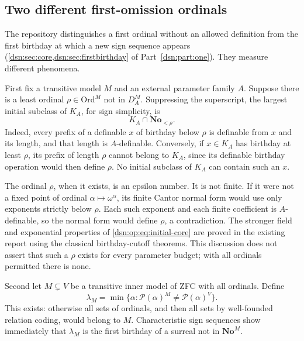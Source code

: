 \documentclass[11pt,a4paper]{article}
\numberwithin{equation}{section}
\theoremstyle{definition}
\theoremstyle{remark}
\newcommand{\No}{\mathbf{No}}
\newcommand{\Ord}{\mathrm{Ord}}
\begin{document}
\subsection{Two different first-omission ordinals}

The repository distinguishes a first ordinal without an allowed
definition from the first birthday at which a new sign sequence appears
(\cref{dsn:sec:core,dsn:sec:firstbirthday} of Part~\ref{dsn:part:one}).  They measure different phenomena.

First fix a transitive model \(M\) and an external parameter family \(A\).
Suppose there is a least ordinal \(\rho\in\Ord^M\) not in \(D_A^M\).
Suppressing the superscript, the
largest initial subclass of \(K_A\), for sign simplicity, is
\begin{equation}\label{dsn:op:eq:initial-core}
 K_A\cap\No_{<\rho}.
\end{equation}
Indeed, every prefix of a definable \(x\) of birthday below \(\rho\)
is definable from \(x\) and its length, and that length is \(A\)-definable.
Conversely, if \(x\in K_A\) has birthday at least \(\rho\), its prefix
of length \(\rho\) cannot belong to \(K_A\), since its definable birthday
operation would then define \(\rho\).  No initial subclass of \(K_A\)
can contain such an \(x\).

The ordinal \(\rho\), when it exists, is an epsilon number.  It is not
finite.  If it were not a fixed point of ordinal
\(\alpha\mapsto\omega^\alpha\), its finite Cantor normal form would use
only exponents strictly below \(\rho\).  Each such exponent and each
finite coefficient is \(A\)-definable, so the normal form would define
\(\rho\), a contradiction.  The stronger field and exponential
properties of \eqref{dsn:op:eq:initial-core} are proved in the existing report
using the classical birthday-cutoff theorems.  This discussion does not
assert that such a \(\rho\) exists for every parameter budget; with all
ordinals permitted there is none.

Second let \(M\subsetneq V\) be a transitive inner model of ZFC with all
ordinals.  Define
\[
 \lambda_M=\min\{\alpha:\mathcal P(\alpha)^M\ne
                              \mathcal P(\alpha)^V\}.
\]
This exists: otherwise all sets of ordinals, and then all sets by
well-founded relation coding, would belong to \(M\).
Characteristic sign sequences show immediately that \(\lambda_M\)
is the first birthday of a surreal not in \(\No^M\).
\end{document}
